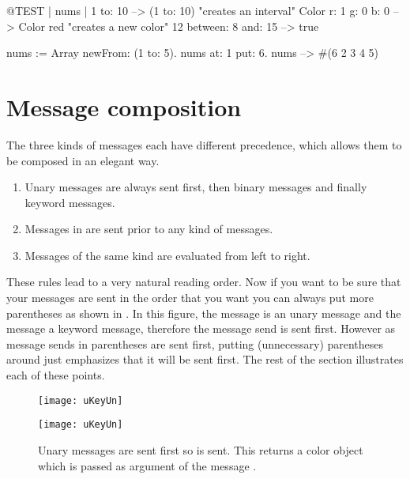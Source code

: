 \documentclass[a4paper,10pt,twoside]{book}
\begin{document}
\begin{code}{@TEST | nums |}
1 to: 10                        --> (1 to: 10)  "creates an interval"
Color r: 1 g: 0 b: 0       --> Color red  "creates a new color"
12 between: 8 and: 15 --> true

nums := Array newFrom: (1 to: 5).
nums at: 1 put: 6.
nums --> #(6 2 3 4 5)
\end{code}


\section{Message composition}
The three kinds of messages each have different precedence, which allows them to be composed in an elegant way. 

\begin{enumerate}
\item Unary messages are always sent first, then binary messages and finally keyword messages. 
\item Messages in  are sent prior to any kind of messages. 
\item Messages of the same kind are evaluated from left to right. 
\end{enumerate}

These rules lead to a very natural reading order. Now if you want to be sure that your messages are sent in the order that you want you can always put more parentheses as shown in . In this  figure, the message  is an unary message and the message  a keyword message, therefore the message send  is sent first. However as message sends in parentheses are sent first, putting (unnecessary) parentheses around  just emphasizes that it will be sent first. The rest of the section illustrates each of these points.

\begin{figure}[ht]
\ifluluelse
	{\centerline{\texttt{[image: uKeyUn]}} }
	{\centerline{\texttt{[image: uKeyUn]}} }
\caption{Unary messages are sent first so  is sent. This returns a color object which is passed as argument of the message .\label{fig:uKeyUn}}
\end{figure}
\end{document}
